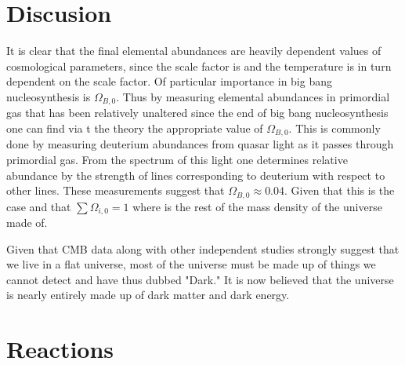 \documentclass[twoside]{article}
\begin{document}
\section{Discusion}
It is clear that the final elemental abundances are heavily dependent  values of cosmological parameters, since the scale factor is and the temperature is in turn dependent on the scale factor. Of particular importance in big bang nucleosynthesis is $\Omega_{B,0}$. Thus by measuring elemental abundances in primordial gas that has been relatively unaltered since the end of big bang nucleosynthesis one can find via t the theory the appropriate value of $\Omega_{B,0}$. This is commonly  done by measuring deuterium abundances from quasar light as it passes through primordial gas. From the spectrum of this light one determines relative abundance by the strength of lines corresponding to deuterium with respect to other lines. These measurements suggest that $\Omega_{B,0}\approx 0.04$.
Given that this is the case and that $\sum \Omega_{i,0} = 1$ where is the rest of the mass density of the universe made of. \par
Given that CMB data along with other independent studies strongly suggest that we live in a flat universe, most of the universe must be made up of things we cannot detect and have thus dubbed "Dark." It is now believed that the universe is nearly entirely made up of dark matter and dark energy.


\newpage
\pagebreak
\appendix
\section{Reactions}\label{a:reac}
\end{document}
